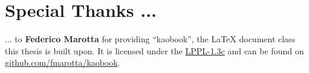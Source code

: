 \documentclass[
	fontsize=10pt, %
	twoside=false, %
	open=any, %
	numbers=noenddot, %
]{kaobook}
\begin{document}
\etocstandarddisplaystyle %
\etocstandardlines %

\tableofcontents %

\listoffigures %

\let\cleardoublepage\bigskip
\let\clearpage\bigskip

\listoftables %

\endgroup


\mainmatter %

\newcommand{\simon}{
    \pagelayout{wide}
    \addpart{The Tesla Coil}
    \pagelayout{margin}
    
}

\newcommand{\kassandra}{
    \pagelayout{wide}
    \addpart{Design and Building}
    \pagelayout{margin}
    
}

\newcommand{\felix}{
    \pagelayout{wide}
    \addpart{MIDI Interrupter}
    \pagelayout{margin}
    
}



\appendix %



\backmatter %

\chapter*{Special Thanks ...}

... to \textbf{Federico Marotta} for providing \enquote{kaobook}, the \LaTeX{} document class this thesis is built upon. It is licensed under the \href{https://www.latex-project.org/lppl/lppl-1-3c/}{LPPL-1.3c} and can be found on \href{https://github.com/fmarotta/kaobook}{github.com/fmarotta/kaobook}.
\end{document}
